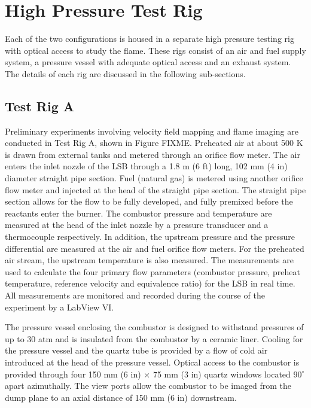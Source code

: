 \section{High Pressure Test Rig}

Each of the two configurations is housed in a separate high pressure testing rig with optical access to study the flame.
These rigs consist of an air and fuel supply system, a pressure vessel with adequate optical access and an exhaust system.
The details of each rig are discussed in the following sub-sections.

\subsection{Test Rig A}

Preliminary experiments involving velocity field mapping and flame imaging are conducted in Test Rig A, shown in Figure FIXME.
Preheated air at about 500 K is drawn from external tanks and metered through an orifice flow meter.
The air enters the inlet nozzle of the LSB through a 1.8 m (6 ft) long, 102 mm (4 in) diameter straight pipe section.
Fuel (natural gas) is metered using another orifice flow meter and injected at the head of the straight pipe section.
The straight pipe section allows for the flow to be fully developed, and fully premixed before the reactants enter the burner.
The combustor pressure and temperature are measured at the head of the inlet nozzle by a pressure transducer and a thermocouple respectively.
In addition, the upstream pressure and the pressure differential are measured at the air and fuel orifice flow meters.
For the preheated air stream, the upstream temperature is also measured.
The measurements are used to calculate the four primary flow parameters (combustor pressure, preheat temperature, reference velocity and equivalence ratio) for the LSB in real time.
All measurements are monitored and recorded during the course of the experiment by a LabView VI.

The pressure vessel enclosing the combustor is designed to withstand pressures of up to 30 atm and is insulated from the combustor by a ceramic liner.
Cooling for the pressure vessel and the quartz tube is provided by a flow of cold air introduced at the head of the pressure vessel.
Optical access to the combustor is provided through four 150 mm (6 in) \(\times\) 75 mm (3 in) quartz windows located \(90^\circ\) apart azimuthally.
The view ports allow the combustor to be imaged from the dump plane to an axial distance of 150 mm (6 in) downstream.

